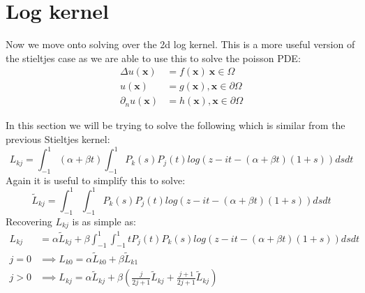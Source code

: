 \documentclass{article}
\begin{document}
\section{Log kernel}
Now we move onto solving over the 2d log kernel.
This is a more useful version of the stieltjes case as we are able to use this to solve the poisson PDE:
\begin{align}
    \Delta u(\textbf{x}) &= f(\textbf{x})\:\textbf{x}\in\Omega\\
    u(\textbf{x}) &= g(\textbf{x}), \textbf{x}\in\partial\Omega\\
    \partial_nu(\textbf{x}) &= h(\textbf{x}), \textbf{x}\in\partial\Omega
\end{align}

In this section we will be trying to solve the following which is similar from the previous Stieltjes kernel:
$$L_{kj}=\int_{-1}^1(\alpha+\beta t)\int_{-1}^1P_k(s)P_j(t)log(z-it-(\alpha+\beta t)(1+s))dsdt$$
Again it is useful to simplify this to solve:
$$\tilde{L}_{kj} = \int_{-1}^1\int_{-1}^1P_k(s)P_j(t)log(z-it-(\alpha+\beta t)(1+s))dsdt$$
Recovering $L_{kj}$ is as simple as:
\begin{align}
    L_{kj}&=\alpha \tilde{L}_{kj} + \beta\int_{-1}^1\int_{-1}^1tP_j(t)P_k(s)log(z-it-(\alpha+\beta t)(1+s))dsdt\\
    j=0 &\implies L_{k0}=\alpha\tilde{L}_{k0}+\beta\tilde{L}_{k1}\\
    j>0 &\implies L_{kj}=\alpha\tilde{L}_{kj}+\beta(\frac{j}{2j+1}\tilde{L}_{kj}+\frac{j+1}{2j+1}\tilde{L}_{kj})\\
\end{align}
\end{document}
